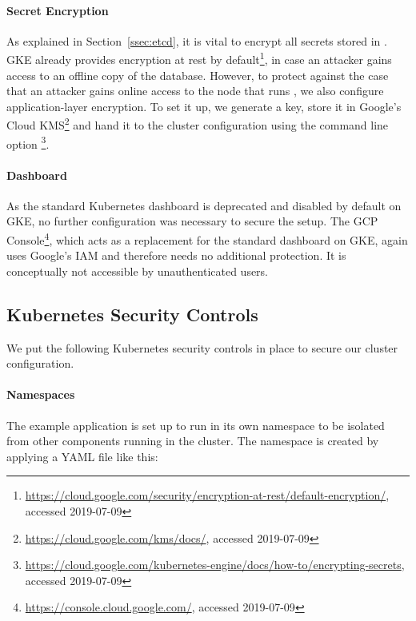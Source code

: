 \paragraph{Secret Encryption}

As explained in Section~\ref{ssec:etcd}, it is vital to encrypt all secrets stored in . \ac{GKE} already provides encryption at rest by default\footnote{\url{https://cloud.google.com/security/encryption-at-rest/default-encryption/}, accessed 2019-07-09}, in case an attacker gains access to an offline copy of the  database. However, to protect against the case that an attacker gains online access to the node that runs , we also configure application-layer encryption. To set it up, we generate a key, store it in Google's Cloud \ac{KMS}\footnote{\url{https://cloud.google.com/kms/docs/}, accessed 2019-07-09} and hand it to the cluster configuration using the command line option \footnote{\url{https://cloud.google.com/kubernetes-engine/docs/how-to/encrypting-secrets}, accessed 2019-07-09}.  

\paragraph{Dashboard}

As the standard Kubernetes dashboard is deprecated and disabled by default on \ac{GKE}, no further configuration was necessary to secure the setup. The \ac{GCP} Console\footnote{\url{https://console.cloud.google.com/}, accessed 2019-07-09}, which acts as a replacement for the standard dashboard on \ac{GKE}, again uses Google's \ac{IAM} and therefore needs no additional protection. It is conceptually not accessible by unauthenticated users. 

\subsection{Kubernetes Security Controls} \label{ssec:exaLayer3}

We put the following Kubernetes security controls in place to secure our cluster configuration.

\paragraph{Namespaces}

The example application is set up to run in its own namespace  to be isolated from other components running in the cluster. The namespace is created by applying a YAML file like this:

